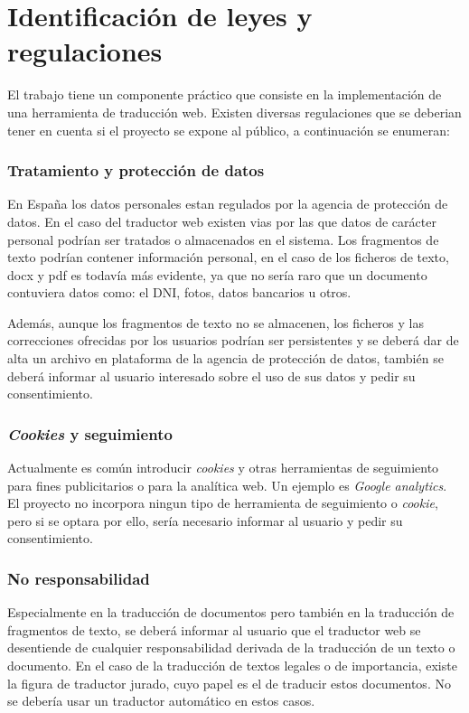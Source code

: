 \section{Identificación de leyes y regulaciones}
El trabajo tiene un componente práctico que consiste en la implementación de una herramienta de traducción web.
Existen diversas regulaciones que se deberian tener en cuenta si el proyecto se expone al público, a continuación se enumeran:
\subsubsection{Tratamiento y protección de datos}
En España los datos personales estan regulados por la agencia de protección de datos. En el caso del traductor web existen vias por las que datos de carácter personal podrían ser tratados o almacenados en el sistema. Los fragmentos de texto podrían contener información personal, en el caso de los ficheros de texto, docx y pdf es todavía más evidente, ya que no sería raro que un documento contuviera datos como: el DNI, fotos, datos bancarios u otros.

Además, aunque los fragmentos de texto no se almacenen, los ficheros y las correcciones ofrecidas por los usuarios podrían ser persistentes y se deberá dar de alta un archivo en plataforma de la agencia de protección de datos, también se deberá informar al usuario interesado sobre el uso de sus datos y pedir su consentimiento.

\subsubsection{\textit{Cookies} y seguimiento}
Actualmente es común introducir \textit{cookies} y otras herramientas de seguimiento para fines publicitarios o para la analítica web. Un ejemplo es \textit{Google analytics}. El proyecto no incorpora ningun tipo de herramienta de seguimiento o \textit{cookie}, pero si se optara por ello, sería necesario informar al usuario y pedir su consentimiento.

\subsubsection{No responsabilidad}
Especialmente en la traducción de documentos pero también en la traducción de fragmentos de texto, se deberá informar al usuario que el traductor web se desentiende de cualquier responsabilidad derivada de la traducción de un texto o documento. En el caso de la traducción de textos legales o de importancia, existe la figura de traductor jurado, cuyo papel es el de traducir estos documentos. No se debería usar un traductor automático en estos casos.

